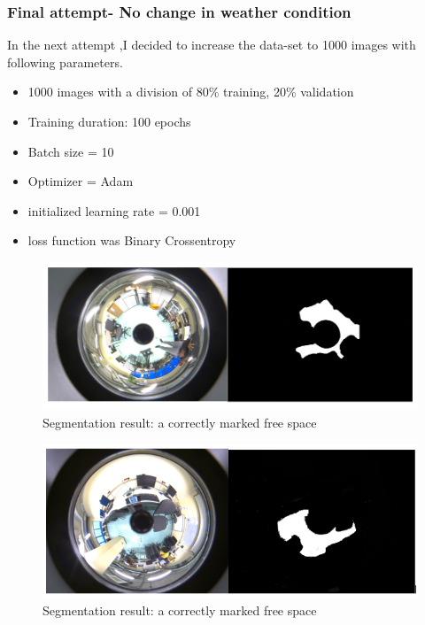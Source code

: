 \documentclass[11pt, a4paper, openany]{book}
\begin{document}
\subsubsection{Final attempt- No change in weather condition}
In the next attempt ,I decided to increase the data-set to 1000 images with following parameters.
\begin{itemize}
     \item 1000 images with a division of 80\% training, 20\% validation
     \item Training duration: 100 epochs
     \item Batch size = 10
     \item Optimizer = Adam
     \item initialized learning rate = 0.001
     \item loss function was Binary Crossentropy
 \end{itemize}

 \begin{figure}[H]
    \centering
    \includegraphics[scale=0.6]{Labbot&ele/conclusion1.png}
    \caption{Segmentation result: a correctly marked free space }
    \label{fig:print} 
\end{figure}

 \begin{figure}[H]
    \centering
    \includegraphics[scale=0.9]{Labbot&ele/w5.png}
    \caption{Segmentation result: a correctly marked free space }
    \label{fig:print} 
\end{figure}
\end{document}
